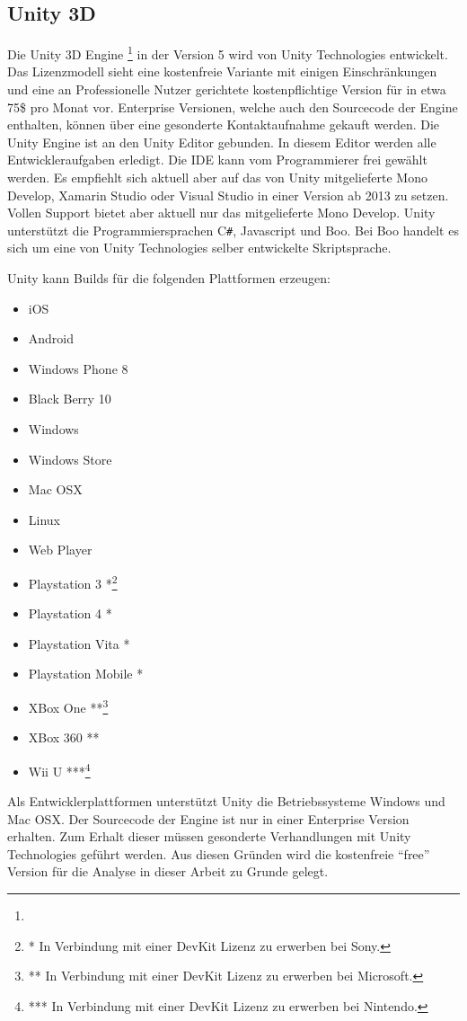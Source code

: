 \documentclass[pagesize, paper=a4, fontsize=12pt, titlepage=true, headings=small, headnosepline, abstractoff, liststotoc, nochapterprefix, plainheadsepline, twoside]{scrreprt}
\newcommand{\CS}{C\texttt{\#}}
\begin{document}
\subsection{Unity 3D}
Die Unity 3D Engine \footnote{} in der Version 5 wird von Unity Technologies entwickelt. Das Lizenzmodell sieht eine kostenfreie Variante mit einigen Einschränkungen und eine an Professionelle Nutzer gerichtete kostenpflichtige Version für in etwa 75\$ pro Monat vor. Enterprise Versionen, welche auch den Sourcecode der Engine enthalten, können über eine gesonderte Kontaktaufnahme gekauft werden. Die Unity Engine ist an den Unity Editor gebunden. In diesem Editor werden alle Entwickleraufgaben erledigt. Die IDE kann vom Programmierer frei gewählt werden. Es empfiehlt sich aktuell aber auf das von Unity mitgelieferte Mono Develop, Xamarin Studio oder Visual Studio in einer Version ab 2013 zu setzen. Vollen Support bietet aber aktuell nur das mitgelieferte Mono Develop. Unity unterstützt die Programmiersprachen \CS, Javascript und Boo. Bei Boo handelt es sich um eine von Unity Technologies selber entwickelte Skriptsprache.

Unity kann Builds für die folgenden Plattformen erzeugen:
\begin{itemize}
\item iOS
\item Android
\item Windows Phone 8
\item Black Berry 10
\item Windows
\item Windows Store
\item Mac OSX
\item Linux
\item Web Player
\item Playstation 3 *\footnote{* In Verbindung mit einer DevKit Lizenz zu erwerben bei Sony.}
\item Playstation 4 *
\item Playstation Vita *
\item Playstation Mobile *
\item XBox One **\footnote{** In Verbindung mit einer DevKit Lizenz zu erwerben bei Microsoft.}
\item XBox 360 **
\item Wii U  ***\footnote{*** In Verbindung mit einer DevKit Lizenz zu erwerben bei Nintendo.}
\end{itemize}

Als Entwicklerplattformen unterstützt Unity die Betriebssysteme Windows und Mac OSX. Der Sourcecode der Engine ist nur in einer Enterprise Version erhalten. Zum Erhalt dieser müssen gesonderte Verhandlungen mit Unity Technologies geführt werden. Aus diesen Gründen wird die kostenfreie “free” Version für die Analyse in dieser Arbeit zu Grunde gelegt.
\end{document}
